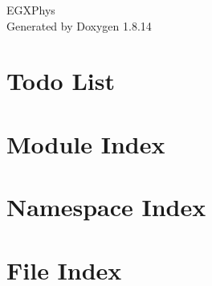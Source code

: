 \documentclass[twoside]{book}
\newcommand{\+}{\discretionary{\mbox{\scriptsize$\hookleftarrow$}}{}{}}
\newcommand{\clearemptydoublepage}{%
  \newpage{\pagestyle{empty}\cleardoublepage}%
}
\begin{document}
\hypersetup{pageanchor=false,
             bookmarksnumbered=true,
             pdfencoding=unicode
            }
\begin{titlepage}
\vspace*{7cm}
\begin{center}%
{\Large E\+G\+X\+Phys }\\
\vspace*{1cm}
{\large Generated by Doxygen 1.8.14}\\
\end{center}
\end{titlepage}
\clearemptydoublepage
{}
\tableofcontents
\clearemptydoublepage
{}
\hypersetup{pageanchor=true}

\chapter{Todo List}
\label{todo}

\chapter{Module Index}

\chapter{Namespace Index}

\chapter{File Index}

\end{document}
